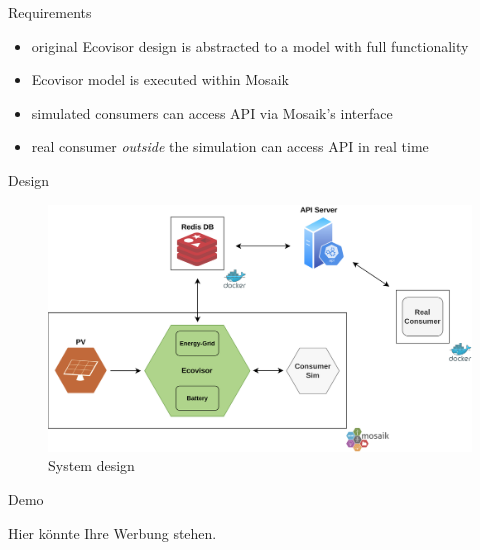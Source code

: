 \begin{frame}{Requirements}
    \begin{center}
        \begin{minipage}{.5\textwidth}
            \begin{itemize}
                \item original Ecovisor design is abstracted to a model with
                    full functionality
                \item Ecovisor model is executed within Mosaik
                \item simulated consumers can access API via Mosaik's interface
                \item real consumer \emph{outside} the simulation can access API
                    in real time
            \end{itemize}
        \end{minipage}
    \end{center}
\end{frame}

\begin{frame}{Design}
    \begin{figure}
    \centering
    \includegraphics[height=.68\textheight]{../../system_design}
    \caption{System design}
    \label{fig:system_design}
    \end{figure}
\end{frame}

\begin{frame}{Demo}
    \begin{center}
        Hier könnte Ihre Werbung stehen.
    \end{center}
\end{frame}
